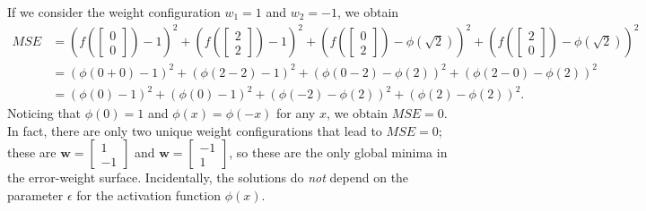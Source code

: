 \documentclass{article}
\renewcommand\vec{\mathbf}
\begin{document}
If we consider the weight configuration $w_1=1$ and $w_2=-1$, we obtain
\begin{align*}
    MSE &= \left(f\left( \begin{bmatrix} 0 \\ 0 \end{bmatrix} \right) - 1 \right)^2 + \left(f\left( \begin{bmatrix} 2 \\ 2 \end{bmatrix} \right) - 1 \right)^2 + \left(f\left( \begin{bmatrix} 0 \\ 2 \end{bmatrix} \right) - \phi\left( \sqrt{2} \right) \right)^2 + \left(f\left( \begin{bmatrix} 2 \\ 0 \end{bmatrix} \right) - \phi\left( \sqrt{2} \right) \right)^2
    \\ &= \left(\phi \left( 0 + 0 \right) - 1 \right)^2 + \left(\phi \left( 2 - 2 \right) - 1 \right)^2 + \left(\phi \left( 0 - 2 \right) - \phi\left( 2 \right) \right)^2 + \left(\phi \left( 2 - 0 \right) - \phi\left( 2 \right) \right)^2
    \\ &= \left(\phi \left( 0 \right) - 1 \right)^2 + \left(\phi \left( 0 \right) - 1 \right)^2 + \left(\phi \left( - 2 \right) - \phi\left( 2 \right) \right)^2 + \left(\phi \left( 2 \right) - \phi\left( 2 \right) \right)^2.
\end{align*}
Noticing that $\phi(0)=1$ and $\phi(x)=\phi(-x)$ for any $x$, we obtain $MSE=0$. 
In fact, there are only two unique weight configurations that lead to $MSE=0$; these are $\vec{w}=\begin{bmatrix}1\\-1 \end{bmatrix}$ and $\vec{w}=\begin{bmatrix}-1\\ 1 \end{bmatrix}$, so these are the only global minima in the error-weight surface. 
Incidentally, the solutions do \textit{not} depend on the parameter $\epsilon$ for the activation function $\phi(x)$. 



\end{document}
